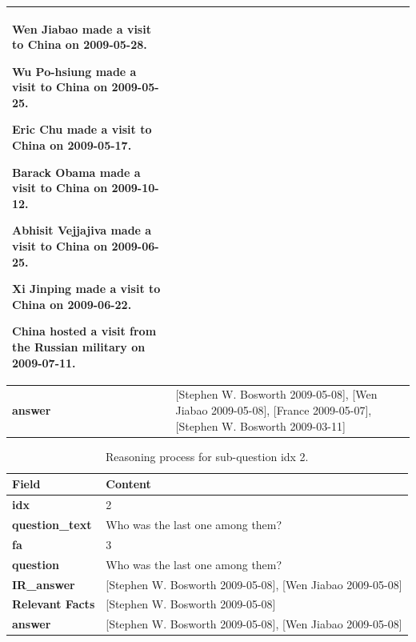 \documentclass[11pt]{article}
\begin{document}
\begin{table}[t]
\begin{tabular}{p{} p{}}
Wen Jiabao made a visit to China on 2009-05-28. \par
Wu Po-hsiung made a visit to China on 2009-05-25. \par
Eric Chu made a visit to China on 2009-05-17. \par
Barack Obama made a visit to China on 2009-10-12. \par
Abhisit Vejjajiva made a visit to China on 2009-06-25. \par
Xi Jinping made a visit to China on 2009-06-22. \par
China hosted a visit from the Russian military on 2009-07-11. \\
\midrule
\textbf{answer} & [Stephen W. Bosworth 2009-05-08], [Wen Jiabao 2009-05-08], [France 2009-05-07], [Stephen W. Bosworth 2009-03-11] \\
\bottomrule
\end{tabular}

\end{table}


\begin{table}[h]
\caption{Reasoning process for sub-question idx 2.}
\label{tab:example-sub3}
\centering
\small
\begin{tabular}{p{} p{}}
\toprule
\textbf{Field} & \textbf{Content} \\
\midrule
\textbf{idx} & 2 \\
\textbf{question\_text} & Who was the last one among them? \\
\textbf{fa} & 3 \\
\textbf{question} & Who was the last one among them? \\
\textbf{IR\_answer} & [Stephen W. Bosworth 2009-05-08], [Wen Jiabao 2009-05-08] \\
\midrule
\textbf{Relevant Facts} &
[Stephen W. Bosworth 2009-05-08]\par
[Wen Jiabao 2009-05-08]\par
[France 2009-05-07]\par
[Stephen W. Bosworth 2009-03-11]\\
\midrule
\textbf{answer} & [Stephen W. Bosworth 2009-05-08], [Wen Jiabao 2009-05-08] \\
\bottomrule
\end{tabular}

\end{table}
\end{document}
